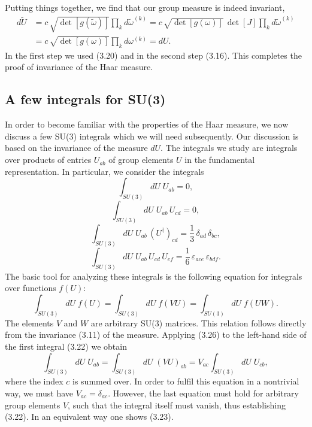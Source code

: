 Putting things together, we find that our group measure is indeed invariant,
\begin{equation}
\begin{split}
  d\tilde U &= c\,\sqrt{\det[g(\tilde\omega)]}\prod_k d\tilde\omega^{(k)}
  = c\,\sqrt{\det[g(\omega)]}\,\det[J]\prod_k d\tilde\omega^{(k)} \\
  &= c\,\sqrt{\det[g(\omega)]}\prod_k d\omega^{(k)} = dU .
\end{split}
\end{equation}
In the first step we used (3.20) and in the second step (3.16). This completes
the proof of invariance of the Haar measure.

\subsection{A few integrals for SU(3)}

In order to become familiar with the properties of the Haar measure, we now
discuss a few SU(3) integrals which we will need subsequently. Our discussion
is based on the invariance of the measure $dU$. The integrals we study are
integrals over products of entries $U_{ab}$ of group elements $U$ in the
fundamental representation. In particular, we consider the integrals
\begin{equation}
  \int_{SU(3)} dU\; U_{ab} = 0 ,
\end{equation}
\begin{equation}
  \int_{SU(3)} dU\; U_{ab}\, U_{cd} = 0 ,
\end{equation}
\begin{equation}
  \int_{SU(3)} dU\; U_{ab}\, (U^\dagger)_{cd} = \frac{1}{3}\,\delta_{ad}\,\delta_{bc} ,
\end{equation}
\begin{equation}
  \int_{SU(3)} dU\; U_{ab}\, U_{cd}\, U_{ef} = \frac{1}{6}\,\varepsilon_{ace}\,\varepsilon_{bdf} .
\end{equation}
The basic tool for analyzing these integrals is the following equation for
integrals over functions $f(U)$:
\begin{equation}
  \int_{SU(3)} dU\; f(U)
  = \int_{SU(3)} dU\; f(VU)
  = \int_{SU(3)} dU\; f(UW) .
\end{equation}
The elements $V$ and $W$ are arbitrary SU(3) matrices. This relation follows
directly from the invariance (3.11) of the measure. Applying (3.26) to the
left-hand side of the first integral (3.22) we obtain
\begin{equation}
  \int_{SU(3)} dU\; U_{ab}
  = \int_{SU(3)} dU\; (VU)_{ab}
  = V_{ac}\int_{SU(3)} dU\; U_{cb} ,
\end{equation}
where the index $c$ is summed over. In order to fulfil this equation in a
nontrivial way, we must have $V_{ac} = \delta_{ac}$. However, the last equation
must hold for arbitrary group elements $V$, such that the integral itself must
vanish, thus establishing (3.22). In an equivalent way one shows (3.23).

